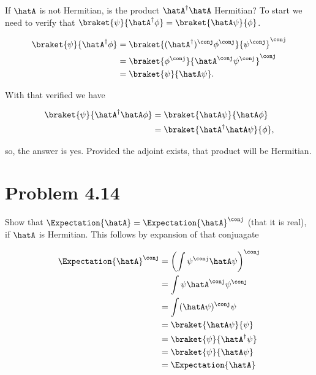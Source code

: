 If $\hatA$ is not Hermitian, is the product $\hatA^\dagger \hatA$ Hermitian?  To start we need to verify that $\braket{\psi}{\hatA^\dagger \phi} = \braket{\hatA \psi}{\phi}$.

\begin{align*}
\braket{ \psi }{ \hatA^\dagger \phi } 
&=
{\braket
{ (\hatA^\dagger)^\conj \phi^\conj } 
{ \psi^\conj }}^\conj \\
&=
{\braket
{ \phi^\conj } 
{ \hatA^\conj \psi^\conj }}^\conj \\
&=
\braket
{ \psi } 
{ \hatA \psi }.
\end{align*}

With that verified we have

\begin{align*}
\braket{ \psi }{ \hatA^\dagger \hatA \phi } 
&=
\braket{ \hatA \psi }{ \hatA \phi }  \\
&=
\braket{ \hatA^\dagger \hatA \psi }{ \phi },
\end{align*}

so, the answer is yes.  Provided the adjoint exists, that product will be Hermitian.

\section{Problem 4.14}

Show that $\Expectation{\hatA} = \Expectation{\hatA}^\conj$ (that it is real), if $\hatA$ is Hermitian.  This follows by expansion of that conjuagate

\begin{align*}
\Expectation{\hatA}^\conj 
&= \left(\int \psi^\conj \hatA \psi \right)^\conj \\
&= \int \psi \hatA^\conj \psi^\conj \\
&= \int (\hatA \psi)^\conj \psi \\
&= \braket{ \hatA \psi }{ \psi } \\
&= \braket{ \psi }{ \hatA^\dagger \psi } \\
&= \braket{ \psi }{ \hatA \psi } \\
&= \Expectation{\hatA}
\end{align*}

\EndArticle
